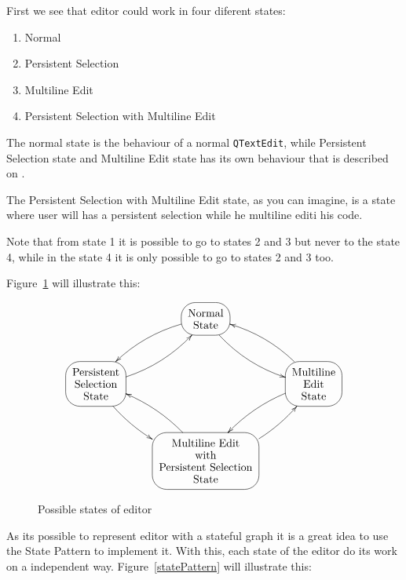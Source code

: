 \documentclass[11pt,a4paper]{report}
\begin{document}
First we see that editor could work in four diferent states:

\begin{enumerate}
\item Normal
\item Persistent Selection
\item Multiline Edit
\item Persistent Selection with Multiline Edit
\end{enumerate}

The normal state is the behaviour of a normal \texttt{QTextEdit}\cite{qtDoc}, while Persistent Selection state and Multiline Edit state has its own behaviour that is described on \cite{functional}.

The Persistent Selection with Multiline Edit state, as you can imagine, is a state where user will has a persistent selection while he multiline editi his code.

Note that from state 1 it is possible to go to states 2 and 3 but never to the state 4, while in the state 4 it is only possible to go to states 2 and 3 too.

Figure~\ref{editorStates} will illustrate this:

\begin{figure}[hbt]
\begin{displaymath}
\xymatrix{
   & *++[F-:<13pt>]\txt{Normal \\ State} 
         \ar@/_1pc/[ld] \ar@/_1pc/[rd] \\
   *++[F-:<13pt>]\txt{Persistent \\ Selection \\ State} 
         \ar@/_1pc/[ru] \ar@/_1pc/[rd] &&
   *++[F-:<13pt>]\txt{Multiline \\ Edit \\ State} 
         \ar@/_1pc/[lu] \ar@/_1pc/[ld] \\
   & *++[F-:<13pt>]\txt{Multiline Edit \\with\\ Persistent Selection \\ State} 
         \ar@/_1pc/[lu] \ar@/_1pc/[ru]
}
\end{displaymath}
\caption{Possible states of editor} \label{editorStates}
\end{figure}

As its possible to represent editor with a stateful graph it is a great idea to use the State Pattern \cite{designPatterns} to implement it. With this, each state of the editor do its work on a independent way. Figure~\ref{statePattern} will illustrate this:
\end{document}
